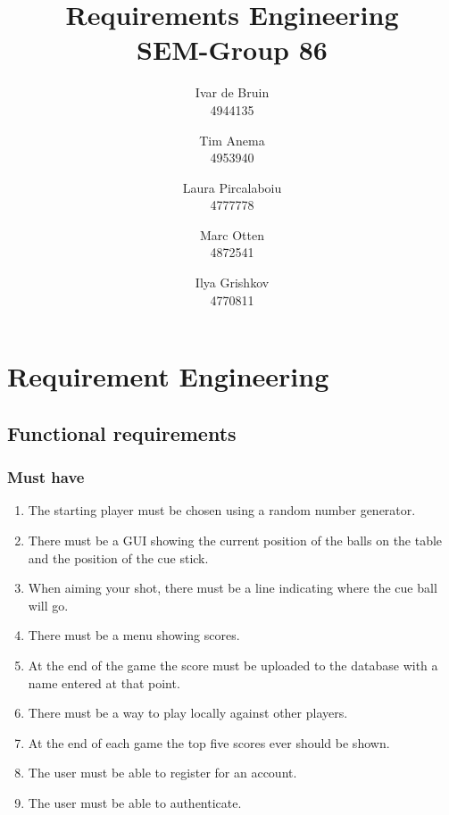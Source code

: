 \documentclass[10pt]{article}
\title{Requirements Engineering\\SEM-Group 86}
\author{
	Ivar de Bruin\\
	4944135
	\and
	Tim Anema\\
	4953940
	\and
	Laura Pircalaboiu\\
	4777778
	\and
	Marc Otten\\
	4872541\\
	\and
	Ilya Grishkov\\
	4770811	
}
\let\oldsection\section
\renewcommand\section{\clearpage\oldsection}
\begin{document}
\maketitle
\pagebreak
\tableofcontents
\section{Requirement Engineering}
	\subsection{Functional requirements}
		\subsubsection{Must have}
			\begin{enumerate}
				\item The starting player must be chosen using a random number generator.
				\item There must be a GUI showing the current position of the balls on the table and the position of the cue stick.\label{req:GUITable}
				\item When aiming your shot, there must be a line indicating where the cue ball will go.
				\item There must be a menu showing scores. \label{req:scoreMenu}
				\item At the end of the game the score must be uploaded to the database with a name entered at that point.	\label{req:leaderboardName}
				\item There must be a way to play locally against other players.\label{req:localPlay}
				\item At the end of each game the top five scores ever should be shown.\label{req:leaderboardDisplay}
				\item The user must be able to register for an account.\label{req:register}
				\item The user must be able to authenticate.\label{req:login}
			\end{enumerate}
\end{document}
